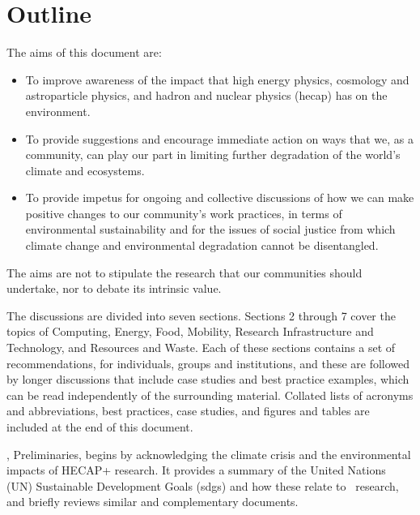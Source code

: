 \documentclass[../SustainableHEP.tex]{subfiles}
\begin{document}
\RaggedRight
\sloppy


\section*{Outline}

The aims of this document are:
\begin{itemize}
    \item To improve awareness of the impact that high energy physics, cosmology and astroparticle physics, and hadron and nuclear physics (\acrshort{hecap}) has on the environment.
    \item To provide suggestions and encourage immediate action on ways that we, as a community, can play our part in limiting further degradation of the world's climate and ecosystems.
    \item To provide impetus for ongoing and collective discussions of how we can make positive changes to our community's work practices, in terms of environmental sustainability and for the issues of social justice from which climate change and environmental degradation cannot be disentangled.
\end{itemize}
The aims are not to stipulate the research that our communities should undertake, nor to debate its intrinsic value.

The discussions are divided into seven sections. Sections 2 through 7 cover the topics of Computing, Energy, Food, Mobility, Research Infrastructure and Technology, and Resources and Waste. Each of these sections contains a set of recommendations, for individuals, groups and institutions, and these are followed by longer discussions that include case studies and best practice examples, which can be read independently of the surrounding material. Collated lists of acronyms and abbreviations, best practices, case studies, and figures and tables are included at the end of this document.

, Preliminaries, begins by acknowledging the climate crisis and the environmental impacts of HECAP+ research. It provides a summary of the United Nations (UN) Sustainable Development Goals (\acrshort{sdg}s) and how these relate to \ACR\ research, and briefly reviews similar and complementary documents.


\newpage
\end{document}
